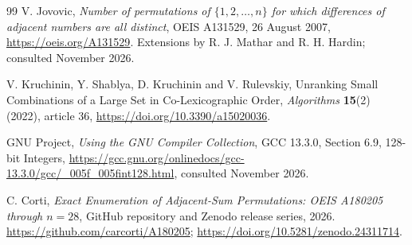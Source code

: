 \documentclass[11pt]{article}
\theoremstyle{definition}
\theoremstyle{remark}
\begin{document}
\begin{thebibliography}{99}
V. Jovovic,
\emph{Number of permutations of $\{1,2,\ldots,n\}$ for which differences
of adjacent numbers are all distinct},
OEIS A131529, 26 August 2007,
\url{https://oeis.org/A131529}.
Extensions by R. J. Mathar and R. H. Hardin; consulted November 2026.

V. Kruchinin, Y. Shablya, D. Kruchinin and V. Rulevskiy,
Unranking Small Combinations of a Large Set in Co-Lexicographic Order,
\emph{Algorithms} \textbf{15}(2) (2022), article 36,
\url{https://doi.org/10.3390/a15020036}.

GNU Project,
\emph{Using the GNU Compiler Collection}, GCC 13.3.0,
Section 6.9, 128-bit Integers,
\url{https://gcc.gnu.org/onlinedocs/gcc-13.3.0/gcc/_005f_005fint128.html},
consulted November 2026.

C. Corti,
\emph{Exact Enumeration of Adjacent-Sum Permutations: OEIS A180205 through
$n=28$}, GitHub repository and Zenodo release series, 2026.
\url{https://github.com/carcorti/A180205};
\url{https://doi.org/10.5281/zenodo.24311714}.

\end{thebibliography}
\end{document}
